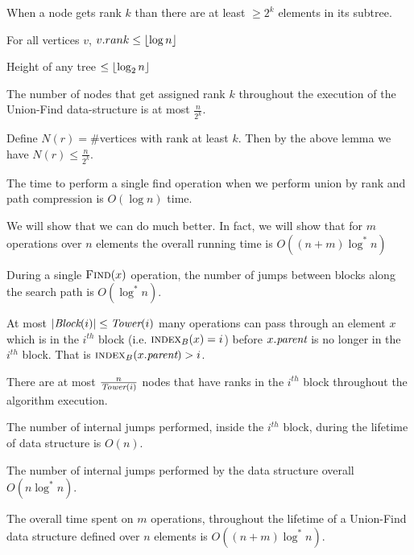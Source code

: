 \begin{lemma}{}{}
	When a node gets rank $k$ than there are at least $\geq 2^k$ elements in its subtree.
\end{lemma}
\begin{corolary}{}{}
	For all vertices $v$, $v.rank\leq \left\lfloor \log n\right\rfloor$
\end{corolary}
\begin{corolary}{}{}
	Height of any tree $\leq \left\lfloor\log _2n\right\rfloor$
\end{corolary}
\begin{lemma}{}{}
	The number of nodes that get assigned rank $k$ throughout the execution of the Union-Find data-structure is at most $\frac{n}{2^k}$.
\end{lemma}
Define $N(r)=\#$vertices with rank at least $k$. Then by the above lemma we have $N(r)\leq \frac{n}{2^k}$.
\begin{lemma}{}{}
	The time to perform a single find operation when we perform union by rank and path
	compression is $O(\log n)$ time.
\end{lemma}
We will show that we can do much better. In fact, we will show that for $m$ operations over $n$ elements the overall running time is $O((n+m)\log ^*n)$

\begin{lemma}{}{}
	During a single $\textsc{Find}(x)$ operation, the number of jumps between blocks along the search path is $O(\log^*n)$.
\end{lemma}
\begin{lemma}{}{}
	At most $|\emph{Block}(i)|\leq \emph{Tower}(i)$ many  operations can pass through an element $x$ which is in the $i^{th}$ block (i.e. $\textsc{index}_B(x)=i$) before $x.\emph{parent}$ is no longer in the $i^{th}$ block. That is $\textsc{index}_B(x.\emph{parent})>i$.
\end{lemma}

\begin{lemma}{}{}
	There are at most $\frac{n}{\emph{Tower}(i)}$ nodes that have ranks in the $i^{th}$ block throughout the algorithm execution.
\end{lemma}

\begin{lemma}{}{}
	The number of internal jumps performed, inside the $i^{th}$ block, during the lifetime of  data structure is $O(n)$.
\end{lemma}

\begin{Theorem}{}{}
	The number of internal jumps performed by the  data structure overall $O(n\log^*n)$.
\end{Theorem}
\begin{Theorem}{}{}
	The overall time spent on $m$  operations, throughout the lifetime of a Union-Find data structure defined over $n$ elements is $O((n+m)\log^*n)$.
\end{Theorem}